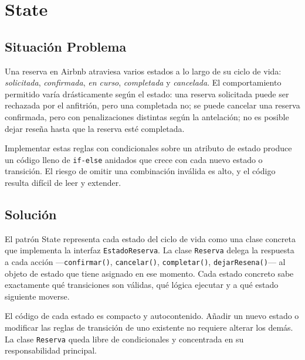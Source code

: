 
\chapter{State}

\section{Situación Problema}

Una reserva en Airbnb atraviesa varios estados a lo largo de su ciclo
de vida: \emph{solicitada}, \emph{confirmada}, \emph{en curso},
\emph{completada} y \emph{cancelada}. El comportamiento permitido varía
drásticamente según el estado: una reserva solicitada puede ser rechazada
por el anfitrión, pero una completada no; se puede cancelar una reserva
confirmada, pero con penalizaciones distintas según la antelación; no
es posible dejar reseña hasta que la reserva esté completada.

Implementar estas reglas con condicionales sobre un atributo de estado
produce un código lleno de \texttt{if-else} anidados que crece con cada
nuevo estado o transición. El riesgo de omitir una combinación inválida
es alto, y el código resulta difícil de leer y extender.

\section{Solución}

El patrón State representa cada estado del ciclo de vida como una clase
concreta que implementa la interfaz \texttt{EstadoReserva}. La clase
\texttt{Reserva} delega la respuesta a cada acción —\texttt{confirmar()},
\texttt{cancelar()}, \texttt{completar()}, \texttt{dejarResena()}— al
objeto de estado que tiene asignado en ese momento. Cada estado concreto
sabe exactamente qué transiciones son válidas, qué lógica ejecutar y a
qué estado siguiente moverse.

El código de cada estado es compacto y autocontenido. Añadir un nuevo
estado o modificar las reglas de transición de uno existente no requiere
alterar los demás. La clase \texttt{Reserva} queda libre de condicionales
y concentrada en su responsabilidad principal.

